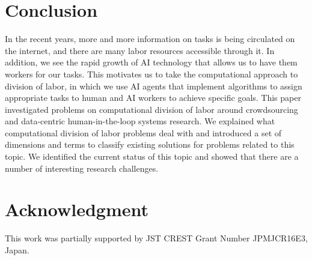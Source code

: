 \section{Conclusion}
\label{sec:conclusion}

In the recent years, more and more information on tasks is being circulated on the internet, and there are many labor resources accessible through it.
In addition, we see the rapid growth of AI technology that allows us to have them workers for our tasks.
This motivates us to take the computational approach to division of labor, in which we use AI agents that implement algorithms  to assign appropriate tasks to human and AI workers to achieve specific goals. 
This paper investigated problems on computational division of labor around crowdsourcing and data-centric human-in-the-loop systems research. 
We explained what computational division of labor problems deal with and introduced a set of dimensions and terms to classify existing solutions for problems related to this topic. We identified the current status of this topic and showed that there are a number of interesting research challenges.

\section*{Acknowledgment}
This work was partially supported by JST CREST Grant Number JPMJCR16E3, Japan.


